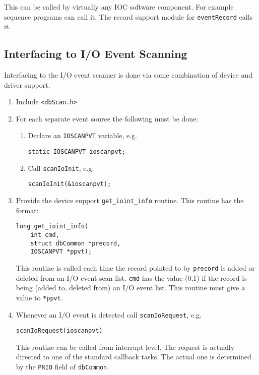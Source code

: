This can be called by virtually any IOC software component. For example sequence programs can call it. The record 
support module for \verb|eventRecord| calls it.

\subsection{Interfacing to I/O Event Scanning}


Interfacing to the I/O event scanner is done via some combination of device and driver support.

\begin{enumerate}
\item Include \verb|<dbScan.h>|

\item For each separate event source the following must be done:

\begin{enumerate}

\item Declare an \verb|IOSCANPVT| variable, e.g.

\begin{verbatim}
static IOSCANPVT ioscanpvt;
\end{verbatim}

\item Call \verb|scanIoInit|, e.g.

\begin{verbatim}
scanIoInit(&ioscanpvt);
\end{verbatim}
\end{enumerate}

\item Provide the device support \verb|get_ioint_info| routine. This routine has the format:

\begin{verbatim}
long get_ioint_info(
    int cmd,
    struct dbCommon *precord,
    IOSCANPVT *ppvt);
\end{verbatim}

This routine is called each time the record pointed to by \verb|precord| is added or deleted from an I/O event scan list. 
\verb|cmd| has the value (0,1) if the record is being (added to, deleted from) an I/O event list. This routine must give a value to \verb|*ppvt|.

\item Whenever an I/O event is detected call \verb|scanIoRequest|, e.g.

\begin{verbatim}
scanIoRequest(ioscanpvt)
\end{verbatim}

This routine can be called from interrupt level. The request is actually directed to one of the standard callback 
tasks. The actual one is determined by the \verb|PRIO| field of \verb|dbCommon|. 

\end{enumerate}

